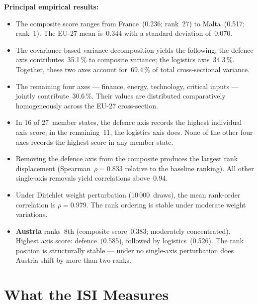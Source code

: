 \medskip
\textbf{Principal empirical results:}
\begin{itemize}[leftmargin=2em]
  \item The \ISI composite score ranges from France~(0.236;
    rank~27) to Malta~(0.517; rank~1).  The EU-27 mean
    is~0.344 with a standard deviation of~0.070.

  \item \begin{sloppypar}The covariance-based variance
    decomposition yields the following: the defence axis
    contributes~35.1\,\% to composite variance; the logistics
    axis~34.3\,\%.  Together, these two axes account
    for~69.4\,\% of total cross-sectional
    variance.\end{sloppypar}

  \item The remaining four axes --- finance, energy, technology,
    critical inputs --- jointly contribute~30.6\,\%.  Their
    values are distributed comparatively homogeneously across
    the EU-27 cross-section.

  \item In 16 of 27~member states, the defence axis records the
    highest individual axis score; in the remaining~11, the
    logistics axis does.  None of the other four axes records
    the highest score in any member state.

  \item Removing the defence axis from the composite produces
    the largest rank displacement
    (Spearman~$\rho = 0.833$ relative to the baseline ranking).
    All other single-axis removals yield correlations
    above~0.94.

  \item Under Dirichlet weight perturbation (10\,000~draws),
    the mean rank-order correlation is
    $\rho = 0.979$.  The rank ordering is stable under
    moderate weight variations.

  \item \textbf{Austria} ranks~8th (composite score~0.383;
    moderately concentrated).  Highest axis score:
    defence~(0.585), followed by logistics~(0.526).  The
    rank position is structurally stable --- under no
    single-axis perturbation does Austria shift by more
    than two ranks.
\end{itemize}


\newpage
\section{What the ISI Measures}
\label{sec:what-the-isi-measures}

